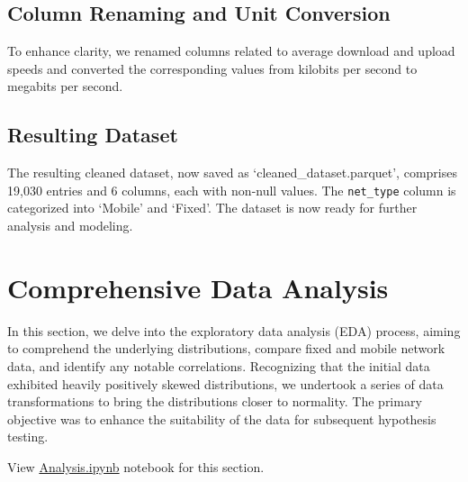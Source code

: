 \documentclass[
  letterpaper,
  DIV=11,
  numbers=noendperiod,
  oneside]{scrartcl}
\begin{document}
\hypertarget{column-renaming-and-unit-conversion}{%
\subsection{Column Renaming and Unit
Conversion}\label{column-renaming-and-unit-conversion}}

To enhance clarity, we renamed columns related to average download and
upload speeds and converted the corresponding values from kilobits per
second to megabits per second.

\hypertarget{resulting-dataset}{%
\subsection{Resulting Dataset}\label{resulting-dataset}}

The resulting cleaned dataset, now saved as `cleaned\_dataset.parquet',
comprises 19,030 entries and 6 columns, each with non-null values. The
\texttt{net\_type} column is categorized into `Mobile' and `Fixed'. The
dataset is now ready for further analysis and modeling.

\hypertarget{comprehensive-data-analysis}{%
\section{Comprehensive Data
Analysis}\label{comprehensive-data-analysis}}

In this section, we delve into the exploratory data analysis (EDA)
process, aiming to comprehend the underlying distributions, compare
fixed and mobile network data, and identify any notable correlations.
Recognizing that the initial data exhibited heavily positively skewed
distributions, we undertook a series of data transformations to bring
the distributions closer to normality. The primary objective was to
enhance the suitability of the data for subsequent hypothesis testing.

\begin{tcolorbox}[enhanced jigsaw, title=\textcolor{quarto-callout-tip-color}{\faLightbulb}\hspace{0.5em}{Comprehensive Data Analysis Section Source Code}, toptitle=1mm, bottomtitle=1mm, bottomrule=.15mm, toprule=.15mm, colback=white, leftrule=.75mm, colframe=quarto-callout-tip-color-frame, colbacktitle=quarto-callout-tip-color!10!white, titlerule=0mm, opacitybacktitle=0.6, arc=.35mm, rightrule=.15mm, left=2mm, breakable, opacityback=0, coltitle=black]

View
\href{https://github.com/brandon-toews/data-analytics-assignment/blob/main/Analysis.ipynb}{Analysis.ipynb}
notebook for this section.

\end{tcolorbox}
\end{document}
